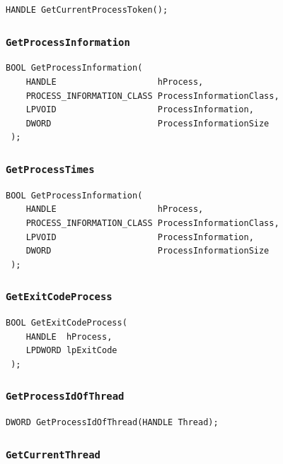 \documentclass[a4paper,12pt,openright]{book}
\begin{document}
\begin{lstlisting}[style=func]
 HANDLE GetCurrentProcessToken();
\end{lstlisting}

\subsubsection{\texttt{GetProcessInformation}}

\begin{lstlisting}[style=func]
 BOOL GetProcessInformation(
	HANDLE                    hProcess,
	PROCESS_INFORMATION_CLASS ProcessInformationClass,
	LPVOID                    ProcessInformation,
	DWORD                     ProcessInformationSize
 );
\end{lstlisting}

\subsubsection{\texttt{GetProcessTimes}}

\begin{lstlisting}[style=func]
 BOOL GetProcessInformation(
	HANDLE                    hProcess,
	PROCESS_INFORMATION_CLASS ProcessInformationClass,
	LPVOID                    ProcessInformation,
	DWORD                     ProcessInformationSize
 );
\end{lstlisting}

\subsubsection{\texttt{GetExitCodeProcess}}

\begin{lstlisting}[style=func]
 BOOL GetExitCodeProcess(
	HANDLE  hProcess,
	LPDWORD lpExitCode
 );
\end{lstlisting}

\subsubsection{\texttt{GetProcessIdOfThread}}

\begin{lstlisting}[style=func]
 DWORD GetProcessIdOfThread(HANDLE Thread);
\end{lstlisting}

\subsubsection{\texttt{GetCurrentThread}}
\end{document}
